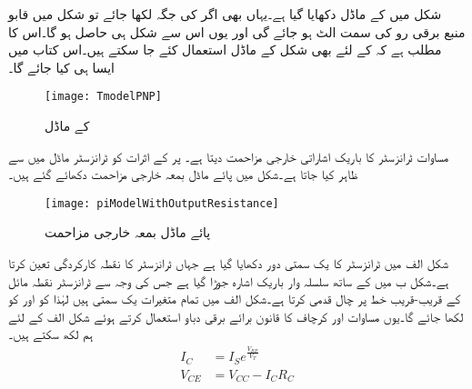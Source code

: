 شکل  میں  کے  ماڈل دکھایا گیا ہے۔یہاں بھی اگر  کی جگہ  لکھا جائے تو شکل میں قابو منبع برقی رو کی سمت الٹ ہو جائے گی اور یوں اس سے شکل  ہی حاصل ہو گا۔اس کا مطلب ہے کہ  کے لئے بھی شکل  کے ماڈل استعمال کئے جا سکتے ہیں۔اس کتاب میں ایسا ہی کیا جائے گا۔
\begin{figure}
\centering
\texttt{[image: TmodelPNP]}
\caption{ کے  ماڈل}
\label{شکل_ٹی_ماڈل_الف}
\end{figure}
مساوات   ٹرانزسٹر کا باریک اشاراتی خارجی مزاحمت  دیتا ہے۔  پر   کے اثرات کو ٹرانزسٹر ماڈل میں  سے ظاہر کیا جاتا ہے۔شکل   میں پائے ماڈل بمعہ خارجی مزاحمت  دکھائے گئے ہیں۔
\begin{figure}
\centering
\texttt{[image: piModelWithOutputResistance]}
\caption{پائے ماڈل بمعہ خارجی مزاحمت }
\label{شکل_پائے_ماڈل_بمع_خارجی_مزاحمت}
\end{figure}
شکل  الف میں ٹرانزسٹر کا یک سمتی دور دکھایا گیا ہے جہاں  ٹرانزسٹر کا نقطہ کارکردگی تعین کرتا ہے۔شکل  ب میں  کے ساتھ سلسلہ وار باریک اشارہ  جوڑا گیا ہے جس کی وجہ سے ٹرانزسٹر نقطہ مائل کے قریب-قریب  خط پر چال قدمی کرتا ہے۔شکل  الف   میں تمام متغیرات یک سمتی ہیں لہٰذا  کو  اور  کو  لکھا جائے گا۔یوں مساوات  اور کرچاف کا قانون برائے برقی دباو استعمال کرتے ہوئے شکل  الف   کے لئے ہم لکھ سکتے ہیں۔
\begin{align}
I_C&=I_S e^{\frac{V_{BE}}{V_T}} \label{مساوات_ٹرانزسٹر_اشارہ_عدم_موجود_لہذا_یکسمتی_رو}\\
V_{CE}&=V_{CC}-I_C R_C \label{مساوات_ٹرانزسٹر_اشارہ_عدم_موجود_لہذا_یکسمتی_دباو}
\end{align}

